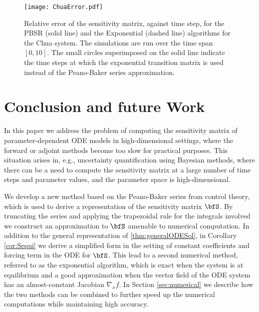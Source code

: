 \documentclass[DIV=12]{scrartcl} %
\theoremstyle{definition}
\begin{document}
\begin{figure}
    \centering
    \texttt{[image: ChuaError.pdf]}
    \caption{Relative error of the sensitivity matrix, against time step, for the PBSR (solid line) and the Exponential (dashed line) algorithms for the Chua system. The simulations are run over the time span $[0,10]$. The small circles superimposed on the solid line indicate the time steps at which the exponential transition matrix is used instead of the Peano-Baker series approximation.}
    \label{fig:Chua}
\end{figure}



\section{Conclusion and future Work}
\label{sec:conclusion}
In this paper we address the problem of computing the sensitivity matrix of parameter-dependent ODE models in high-dimensional settings, where the forward or adjoint methods become too slow for practical purposes. This situation arises in, e.g., uncertainty quantification using Bayesian methods, where there can be a need to compute the sensitivity matrix at a large number of time steps and parameter values, 
and the parameter space is high-dimensional. 

We develop a new method based on the Peano-Baker series from control theory, which is used to derive a representation of the sensitivity matrix $\bfS$. By truncating the series and applying the trapezoidal rule for the integrals involved we construct an approximation to $\bfS$ amenable to numerical computation. In addition to the general representation of \ref{thm:generalODESol}, in Corollary \ref{cor:Sequi} we derive a simplified form in the setting of constant coefficients and forcing term in the ODE for $\bfS$. This lead to a second numerical method, referred to as the exponential algorithm, which is exact when the system is at equilibrium and a good approximation when the vector field of the ODE system has an almost-constant Jacobian $\nabla _x f$. In Section \ref{sec:numerical} we describe how the two methods can be combined to further speed up the numerical computations while maintaining high accuracy.
\end{document}
